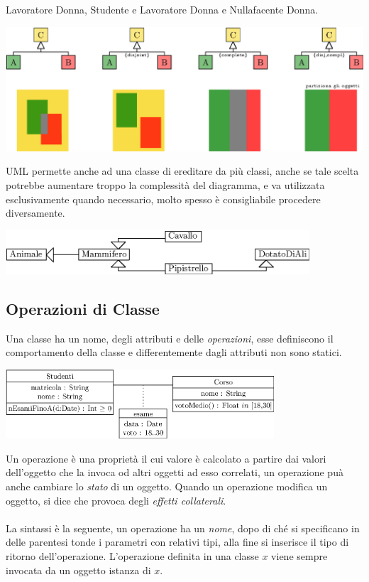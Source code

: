 \documentclass[12pt, letterpaper]{article}
\newcommand{\acc}{\\\hphantom{}\\}
\begin{document}
Lavoratore Donna,
Studente e Lavoratore Donna e
Nullafacente Donna.\begin{center}
    \includegraphics[width=1\textwidth ]{images/criteriDisjointComplete.eps}
\end{center} 
UML permette anche ad una classe di ereditare da più classi, anche se tale scelta potrebbe 
aumentare troppo la complessità del diagramma, e va utilizzata esclusivamente quando necessario, molto spesso 
è consigliabile procedere diversamente.\begin{center}
    \includegraphics[width=0.85\textwidth ]{images/eredMultipla.eps}
\end{center}
\subsection{Operazioni di Classe}
Una classe ha un nome, degli attributi e delle \textit{operazioni}, 
esse definiscono il comportamento della classe e differentemente dagli attributi 
non sono statici.\begin{center}
    \includegraphics[width=0.75\textwidth ]{images/operazione.eps}
\end{center}
Un operazione è una proprietà il cui valore è calcolato a 
partire dai valori dell'oggetto che la invoca od altri oggetti ad esso 
correlati, un operazione puà anche cambiare lo \textit{stato} di un 
oggetto. Quando un operazione modifica un oggetto, si dice che provoca degli 
\textit{effetti collaterali}.\acc 
La sintassi è la seguente, un operazione ha un \textit{nome}, dopo di ché 
si specificano in delle parentesi tonde i parametri con relativi tipi, alla fine 
si inserisce il tipo di ritorno dell'operazione. L'operazione definita in 
 una classe $x$ viene sempre invocata da un oggetto istanza di $x$.
\end{document}
